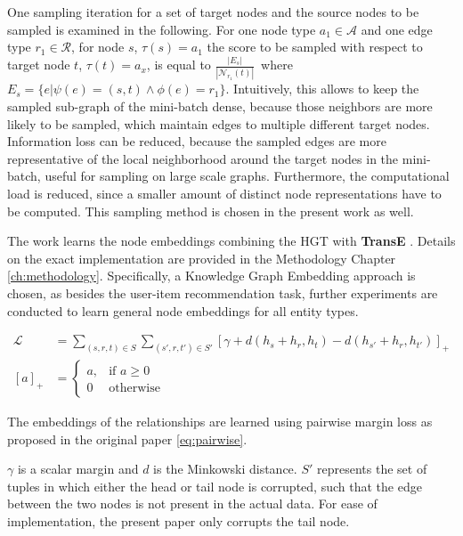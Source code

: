 One sampling iteration for a set of target nodes and the source nodes to be sampled is examined in the following. For one node type $a_1 \in \mathcal{A}$ and one edge type $r_1 \in \mathcal{R}$, for node $s$, $\tau(s) = a_1$ the score to be sampled with respect to target node $t$, $\tau(t)=a_x$, is equal to $\frac{|E_s|}{|\mathcal{N}_{r_1}(t)|}$\, where $E_s = \{e | \psi(e) = (s,t) \land \phi(e) = r_1 \}$. Intuitively, this allows to keep the sampled sub-graph of the mini-batch dense, because those neighbors are more likely to be sampled, which maintain edges to multiple different target nodes. Information loss can be reduced, because the sampled edges are more representative of the local neighborhood around the target nodes in the mini-batch, useful for sampling on large scale graphs.  Furthermore, the computational load is reduced, since a smaller amount of distinct node representations have to be computed. This sampling method is chosen in the present work as well.

The work learns the node embeddings  combining the HGT with \textbf{TransE} \parencite{bordes2013translating}. Details on the exact implementation are provided in the Methodology Chapter \ref{ch:methodology}. Specifically, a Knowledge Graph Embedding approach is chosen, as besides the user-item  recommendation task, further experiments are conducted to learn general node embeddings for all entity types. 


\begin{equation}
\begin{aligned}
\mathcal{L} &= \sum_{(s,r,t)\in S} \sum_{(s',r,t') \in S'} [\gamma + d(h_s + h_r, h_t) - d(h_{s'} + h_r, h_{t'})]_{+}\\
[a]_{+} &=  \begin{cases}
    a,& \text{if } a\geq 0\\
    0              & \text{otherwise}
\end{cases}
\end{aligned}
\label{eq:pairwise}
\end{equation}

The embeddings of the relationships are learned using pairwise margin loss \parencite{pytorchloss} as proposed in the original paper \parencite{bordes2013translating} \eqref{eq:pairwise}.



$\gamma$ is a scalar margin and $d$ is the Minkowski distance. $S'$ represents the set of tuples in which either the head or tail node is corrupted, such that the edge between the two nodes is not present in the actual data. For ease of implementation, the present paper only corrupts the tail node.
